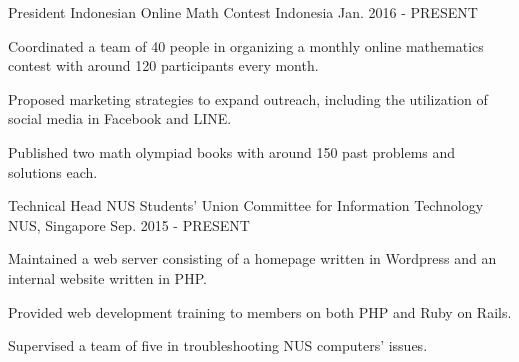 

\begin{cventries}


	\cventry
	{President} %
	{Indonesian Online Math Contest} %
	{Indonesia} %
	{Jan. 2016 - PRESENT} %
	{ %
		\begin{cvitems}
		\item {Coordinated a team of 40 people in organizing a monthly online mathematics contest with around 120 participants every month.}
		\item {Proposed marketing strategies to expand outreach, including the utilization of social media in Facebook and LINE.}
		\item {Published two math olympiad books with around 150 past problems and solutions each.}
		\end{cvitems}
	}


	\cventry
	{Technical Head} %
	{NUS Students' Union Committee for Information Technology} %
	{NUS, Singapore} %
	{Sep. 2015 - PRESENT} %
	{ %
		\begin{cvitems}
		\item {Maintained a web server consisting of a homepage written in Wordpress and an internal website written in PHP.}
		\item {Provided web development training to members on both PHP and Ruby on Rails.}
		\item {Supervised a team of five in troubleshooting NUS computers' issues.}
		\end{cvitems}
	}


\end{cventries}
